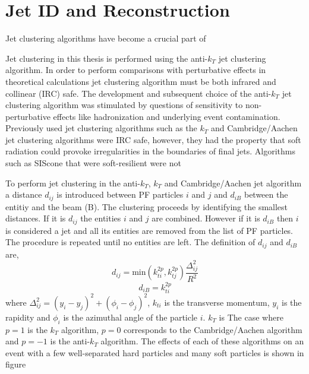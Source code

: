 \section{Jet ID and Reconstruction}
Jet clustering algorithms have become a crucial part of %

Jet clustering in this thesis is performed using the anti-$k_{T}$ jet clustering algorithm.
In order to perform %
comparisons with perturbative effects in theoretical calculations jet clustering algorithm
must be both infrared and collinear (IRC) safe. %
The development and subsequent choice of the anti-$k_{T}$ jet clustering algorithm
was stimulated by questions of sensitivity to non-perturbative effects like hadronization
and underlying event contamination. Previously used jet clustering algorithms
such as the $k_{T}$ %
and Cambridge/Aachen %
jet clustering algorithms were IRC safe, however, they
had the property that soft radiation could provoke irregularities in the boundaries
of final jets. 
Algorithms such as SIScone %
that were soft-resilient were not %

To perform jet clustering in the anti-$k_{T}$, $k_{T}$ and Cambridge/Aachen jet algorithm
a distance $d_{ij}$ is introduced between PF particles $i$ and $j$ and $d_{iB}$ between
the entitiy and the beam (B). The clustering proceeds by identifying the smallest distances.
If it is $d_{ij}$ the entities $i$ and $j$ are combined. However if it is $d_{iB}$ then $i$ 
is considered a jet and all its entities are removed from the list of PF particles. The procedure
is repeated until no entities are left. The definition of $d_{ij}$ and $d_{iB}$ are,
\begin{equation}
d_{ij}=\mathrm{min}(k_{ti}^{2p},k_{tj}^{2p})\frac{\Delta^{2}_{ij}}{R^{2}}
\end{equation}
\begin{equation}
d_{iB}=k_{ti}^{2p}
\end{equation}
where $\Delta_{ij}^{2}=(y_{i}-y_{j})^{2}+(\phi_{i}-\phi_{j})^{2}$, $k_{ti}$ is the 
transverse momentum, $y_{i}$ is the rapidity and $\phi_{i}$ is the azimuthal angle of 
the particle $i$. 
$k_{T}$ is %
The case where $p=1$ is the $k_{T}$ algorithm, $p=0$ corresponds to the Cambridge/Aachen
algorithm and $p=-1$ is the anti-$k_{T}$ algorithm.
The effects of each of these algorithms on an event with a few well-separated hard particles
and many soft particles is shown in figure%


